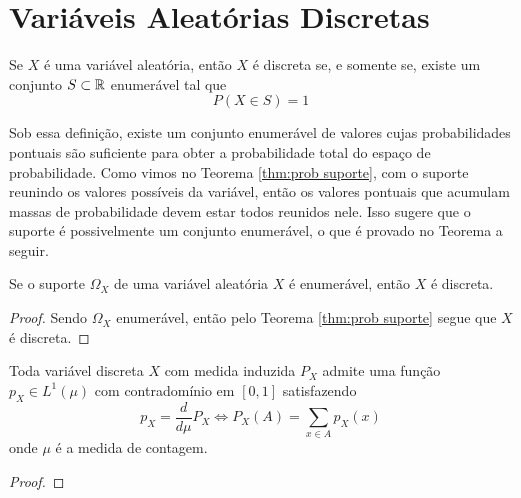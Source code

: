 \section{Variáveis Aleatórias Discretas}

\begin{def:variavel discreta}
Se $X$ é uma variável aleatória, então $X$ é discreta se, e somente se, existe um
conjunto $S \subset \mathbb{R}$ enumerável tal que
\[
	P(X \in S) = 1
\]
\end{def:variavel discreta}

Sob essa definição, existe um conjunto enumerável de valores cujas probabilidades pontuais
são suficiente para obter a probabilidade total do espaço de probabilidade.
Como vimos no Teorema \ref{thm:prob suporte}, com o suporte reunindo os valores possíveis
da variável, então os valores pontuais que acumulam massas de probabilidade devem estar
todos reunidos nele.
Isso sugere que o suporte é possivelmente um conjunto enumerável, o que é provado no
Teorema a seguir.

\begin{prop:suporte enumeravel}
Se o suporte $\Omega_X$ de uma variável aleatória $X$ é enumerável, então $X$ é discreta.
\begin{proof}
	Sendo $\Omega_X$ enumerável, então pelo Teorema \ref{thm:prob suporte} segue que $X$
	é discreta.
\end{proof}
\end{prop:suporte enumeravel}


\begin{prop:existencia fmp}
\label{prop:existencia fmp}
Toda variável discreta $X$ com medida induzida $P_X$ admite uma função $p_X \in L^1(\mu)$
com contradomínio em $[0, 1]$ satisfazendo
\[
	p_X = \frac{d}{d\mu} P_X \Longleftrightarrow P_X(A) = \sum_{x \in A} p_X(x)
\]
onde $\mu$ é a medida de contagem.
\begin{proof}
\end{proof}
\end{prop:existencia fmp}

